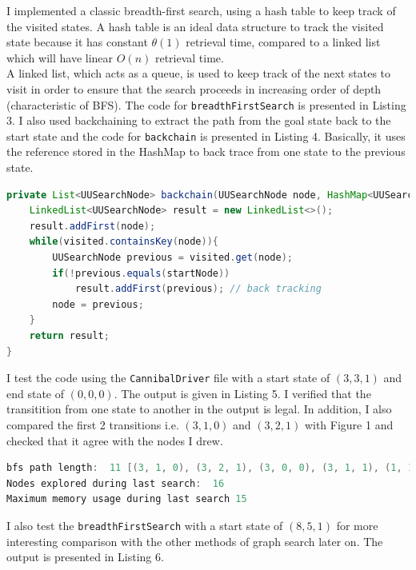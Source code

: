 \documentclass[9.5pt]{extarticle}
\begin{document}
I implemented a classic breadth-first search, using a hash table to keep track of the visited states. A hash table is an ideal data structure to track the visited state because it has constant $\theta(1)$ retrieval time, compared to a linked list which will have linear $O(n)$ retrieval time.\\

A linked list, which acts as a queue, is used to keep track of the next states to visit in order to ensure that the search proceeds in increasing order of depth (characteristic of BFS). The code for  \verb`breadthFirstSearch` is presented in Listing 3. I also used backchaining to extract the path from the goal state back to the start state and the code for \verb`backchain` is presented in Listing 4. Basically, it uses the reference stored in the HashMap to back trace from one state to the previous state.\\

\begin{lstlisting}[language=java,caption={Java code for backchaining}]
private List<UUSearchNode> backchain(UUSearchNode node, HashMap<UUSearchNode, UUSearchNode> visited) {
	LinkedList<UUSearchNode> result = new LinkedList<>();
	result.addFirst(node);
	while(visited.containsKey(node)){
		UUSearchNode previous = visited.get(node);
		if(!previous.equals(startNode))
			result.addFirst(previous); // back tracking
		node = previous;
	}
	return result;
}
\end{lstlisting}

I test the code using the \verb`CannibalDriver` file with a start state of $(3,3,1)$ and end state of $(0,0,0)$. The output is given in Listing 5. I verified that the transitition from one state to another in the output is legal. In addition, I also compared the first 2 transitions i.e. $(3,1,0)$ and $(3,2,1)$ with Figure 1 and checked that it agree with the nodes I drew.\\

\begin{lstlisting}[language=java,caption={Output for BFS for start state of (3, 3, 1)}]
bfs path length:  11 [(3, 1, 0), (3, 2, 1), (3, 0, 0), (3, 1, 1), (1, 1, 0), (2, 2, 1), (0, 2, 0), (0, 3, 1), (0, 1, 0), (0, 2, 1), (0, 0, 0)]
Nodes explored during last search:  16
Maximum memory usage during last search 15
\end{lstlisting}

I also test the \verb`breadthFirstSearch` with a start state of $(8,5,1)$ for more interesting comparison with the other methods of graph search later on. The output is presented in Listing 6.
\end{document}
